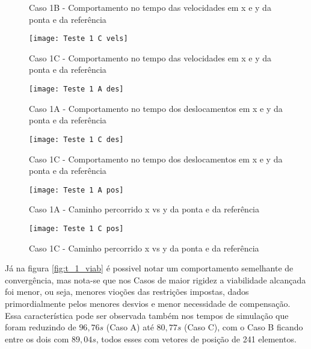 \begin{figure}[!htb]
    \begin{center}
    \caption{Caso 1B - Comportamento no tempo das velocidades em x e y da ponta e da referência}
    \label{fig:t_1b_vels}
    \end{center}
\end{figure}

\begin{figure}[!htb]
    \begin{center}
    \caption{Caso 1C - Comportamento no tempo das velocidades em x e y da ponta e da referência}
    \texttt{[image: Teste 1 C vels]}
    \label{fig:t_1c_vels}
    \end{center}
\end{figure}

\begin{figure}[!htb]
    \begin{center}
    \caption{Caso 1A - Comportamento no tempo dos deslocamentos em x e y da ponta e da referência}
    \texttt{[image: Teste 1 A des]}
    \label{fig:t_1a_des}
    \end{center}
\end{figure}

\begin{figure}[!htb]
    \begin{center}
    \caption{Caso 1C - Comportamento no tempo dos deslocamentos em x e y da ponta e da referência}
    \texttt{[image: Teste 1 C des]}
    \label{fig:t_1c_des}
    \end{center}
\end{figure}

\begin{figure}[!htb]
    \begin{center}
    \caption{Caso 1A - Caminho percorrido x vs y da ponta e da referência}
    \texttt{[image: Teste 1 A pos]}
    \label{fig:t_1a_pos}
    \end{center}
\end{figure}

\begin{figure}[!htb]
    \begin{center}
    \caption{Caso 1C - Caminho percorrido x vs y da ponta e da referência}
    \texttt{[image: Teste 1 C pos]}
    \label{fig:t_1c_pos}
    \end{center}
\end{figure}

Já na figura \ref{fig:t_1_viab} é possivel notar um comportamento semelhante de convergência, mas nota-se que
nos Casos de maior rigidez a viabilidade alcançada foi menor, ou seja, menores vioções das restrições impostas, dados
primordialmente pelos menores desvios e menor necessidade de compensação.
Essa característica pode ser observada também nos tempos de simulação que foram reduzindo de $96,76 s$ (Caso A) até
$80,77 s$ (Caso C), com o Caso B ficando entre os dois com $89,04 s$, todos esses com vetores de posição de 241 elementos.

